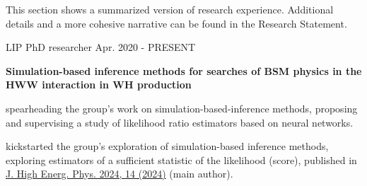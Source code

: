 
This section shows a summarized version of research experience. Additional details and a more cohesive narrative can be found in the Research Statement.

\begin{cventries}

    \cventry
    {LIP}
    {PhD researcher}
    {}
    {Apr. 2020 - PRESENT}
    {
        \textbf{Simulation-based inference methods for searches of BSM physics in the HWW interaction in WH production}\vspace{12pt}
        \begin{cvitems}      
            \item {spearheading the group's work on simulation-based-inference methods, proposing and supervising a study of likelihood ratio estimators based on neural networks.}
            \item {kickstarted the group's exploration of simulation-based inference methods, exploring estimators of a sufficient statistic of the likelihood (score), published in \href{https://doi.org/10.1007/JHEP04(2024)014}{J. High Energ. Phys. 2024, 14 (2024)} (main author).}
        \end{cvitems}
    }


\end{cventries}
